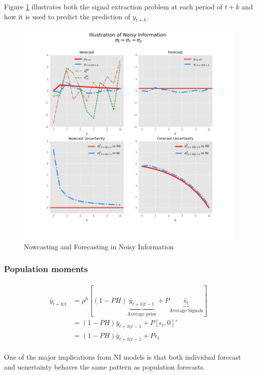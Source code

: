 \documentclass[]{article}
\begin{document}
Figure \ref{IllustrateNI} illustrates both the signal extraction problem at each period of $t+k$ and how it is used to predict the prediction of $y_{t+h}$. 


\begin{figure}[ht]
	\centering
	\includegraphics[width=13cm]{figures/ni_illustration.png}  
	\caption{Nowcasting and Forecasting in Noisy Information}
	\label{IllustrateNI}
\end{figure}


\subsubsection{Population moments}

\begin{eqnarray}
\begin{aligned}
\bar y_{t+h|t} & = \rho^h [(1-PH) \underbrace{\bar  y_{t+h|t-1}}_{\text{Average prior}} + P \underbrace{\bar s_{t}}_{\text{Average Signals}}] \\
& = (1-PH) \bar y_{t+h|t-1}+ P [\epsilon_t, 0]' \\
& = (1-PH) \bar y_{t+h|t-1} + P \epsilon_t
\end{aligned}
\end{eqnarray}

One of the major implications from NI models is that both individual forecast and ucnertainty behaves the same pattern as population forecasts. 
\end{document}
